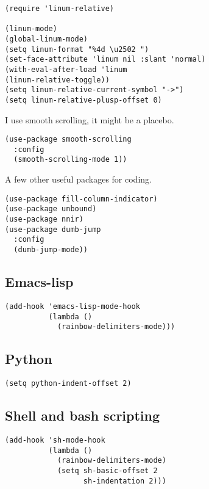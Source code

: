 \documentclass{article}
\begin{document}
\begin{verbatim}
(require 'linum-relative)

(linum-mode)
(global-linum-mode)
(setq linum-format "%4d \u2502 ")
(set-face-attribute 'linum nil :slant 'normal)
(with-eval-after-load 'linum
(linum-relative-toggle))
(setq linum-relative-current-symbol "->")
(setq linum-relative-plusp-offset 0)
\end{verbatim}

I use smooth scrolling, it might be a placebo.

\begin{verbatim}
(use-package smooth-scrolling
  :config
  (smooth-scrolling-mode 1))
\end{verbatim}

A few other useful packages for coding.

\begin{verbatim}
(use-package fill-column-indicator)
(use-package unbound)
(use-package nnir)
(use-package dumb-jump
  :config
  (dumb-jump-mode))
\end{verbatim}

\subsection{Emacs-lisp}
\label{sec-10-2}

\begin{verbatim}
(add-hook 'emacs-lisp-mode-hook
          (lambda ()
            (rainbow-delimiters-mode)))
\end{verbatim}

\subsection{Python}
\label{sec-10-3}

\begin{verbatim}
(setq python-indent-offset 2)
\end{verbatim}

\subsection{Shell and bash scripting}
\label{sec-10-4}

\begin{verbatim}
(add-hook 'sh-mode-hook
          (lambda ()
            (rainbow-delimiters-mode)
            (setq sh-basic-offset 2
                  sh-indentation 2)))
\end{verbatim}
\end{document}
